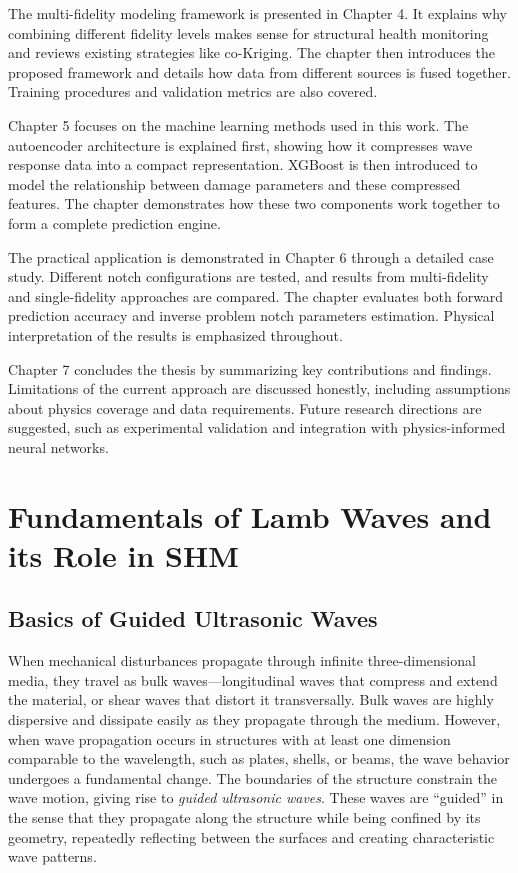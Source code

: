 \documentclass[12pt,a4paper]{report}
\begin{document}
The multi-fidelity modeling framework is presented in Chapter 4. It explains why combining different fidelity levels makes sense for structural health monitoring and reviews existing strategies like co-Kriging. The chapter then introduces the proposed framework and details how data from different sources is fused together. Training procedures and validation metrics are also covered.

Chapter 5 focuses on the machine learning methods used in this work. The autoencoder architecture is explained first, showing how it compresses wave response data into a compact representation. XGBoost is then introduced to model the relationship between damage parameters and these compressed features. The chapter demonstrates how these two components work together to form a complete prediction engine.

The practical application is demonstrated in Chapter 6 through a detailed case study. Different notch configurations are tested, and results from multi-fidelity and single-fidelity approaches are compared. The chapter evaluates both forward prediction accuracy and inverse problem notch parameters estimation. Physical interpretation of the results is emphasized throughout.

Chapter 7 concludes the thesis by summarizing key contributions and findings. Limitations of the current approach are discussed honestly, including assumptions about physics coverage and data requirements. Future research directions are suggested, such as experimental validation and integration with physics-informed neural networks.

\chapter{Fundamentals of Lamb Waves and its Role in SHM}

\section{Basics of Guided Ultrasonic Waves}

When mechanical disturbances propagate through infinite three-dimensional media, they travel as bulk waves—longitudinal waves that compress and extend the material, or shear waves that distort it transversally. Bulk waves are highly dispersive and dissipate easily as they propagate through the medium. However, when wave propagation occurs in structures with at least one dimension comparable to the wavelength, such as plates, shells, or beams, the wave behavior undergoes a fundamental change. The boundaries of the structure constrain the wave motion, giving rise to \textit{guided ultrasonic waves}. These waves are ``guided'' in the sense that they propagate along the structure while being confined by its geometry, repeatedly reflecting between the surfaces and creating characteristic wave patterns.
\end{document}

